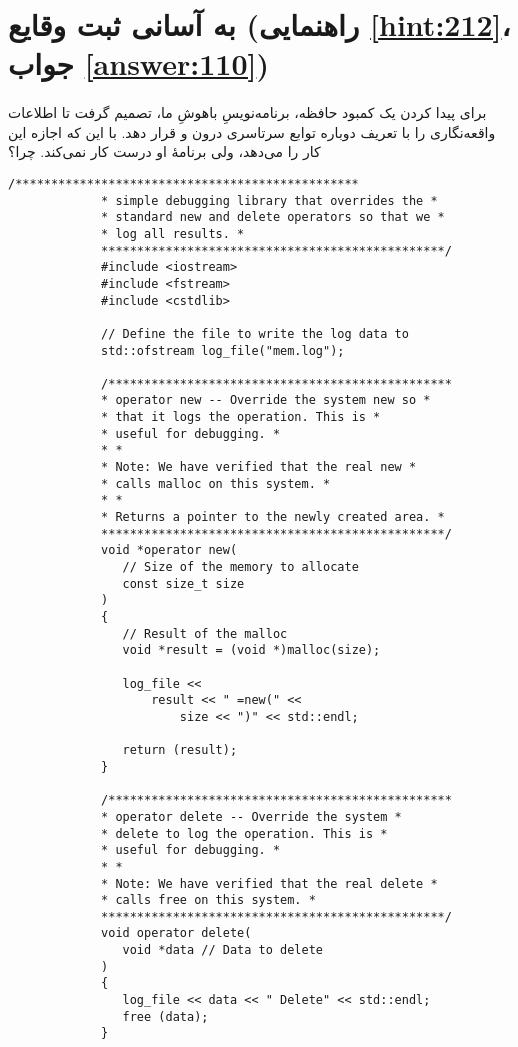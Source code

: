 \section[به آسانی ثبت وقایع]{به آسانی ثبت وقایع \protect{} (راهنمایی \ref{hint:212}، جواب \ref{answer:110})}
\paragraph{}\label{prog:90}
برای پیدا کردن یک کمبود حافظه، برنامه‌نویسِ باهوشِ ما، تصمیم گرفت تا اطلاعات واقعه‌نگاری را با تعریف دوباره توابع سرتاسری درون  و  قرار دهد. با این که  اجازه این کار را می‌دهد، ولی برنامهٔ او درست کار نمی‌کند. چرا؟

\begin{LTR}
        \begin{lstlisting}[style=C++Style]
             /************************************************
             * simple debugging library that overrides the *
             * standard new and delete operators so that we *
             * log all results. *
             ************************************************/
             #include <iostream>
             #include <fstream>
             #include <cstdlib>

             // Define the file to write the log data to
             std::ofstream log_file("mem.log");

             /************************************************
             * operator new -- Override the system new so *
             * that it logs the operation. This is *
             * useful for debugging. *
             * *
             * Note: We have verified that the real new *
             * calls malloc on this system. *
             * *
             * Returns a pointer to the newly created area. *
             ************************************************/
             void *operator new(
             	// Size of the memory to allocate
             	const size_t size
             )
             {
             	// Result of the malloc
             	void *result = (void *)malloc(size);

             	log_file <<
             		result << " =new(" <<
             			size << ")" << std::endl;

             	return (result);
             }

             /************************************************
             * operator delete -- Override the system *
             * delete to log the operation. This is *
             * useful for debugging. *
             * *
             * Note: We have verified that the real delete *
             * calls free on this system. *
             ************************************************/
             void operator delete(
             	void *data // Data to delete
             )
             {
             	log_file << data << " Delete" << std::endl;
             	free (data);
             }


\end{lstlisting}
\end{LTR}
